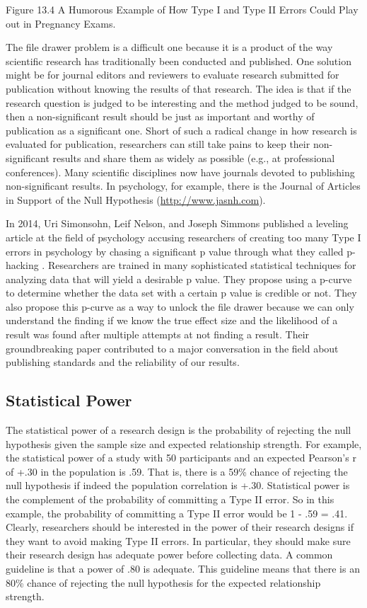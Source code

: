 Figure 13.4 A Humorous Example of How Type I and Type II Errors Could Play out in Pregnancy Exams.


The file drawer problem is a difficult one because it is a product of the way scientific research has traditionally been conducted and published. One solution might be for journal editors and reviewers to evaluate research submitted for publication without knowing the results of that research. The idea is that if the research question is judged to be interesting and the method judged to be sound, then a non-significant result should be just as important and worthy of publication as a significant one. Short of such a radical change in how research is evaluated for publication, researchers can still take pains to keep their non-significant results and share them as widely as possible (e.g., at professional conferences). Many scientific disciplines now have journals devoted to publishing non-significant results. In psychology, for example, there is the Journal of Articles in Support of the Null Hypothesis (\url{http://www.jasnh.com}).


In 2014, Uri Simonsohn, Leif Nelson, and Joseph Simmons published a leveling article at the field of psychology accusing researchers of creating too many Type I errors in psychology by chasing a significant p value through what they called p-hacking \citep{simonsohn_p-curve:_2014}. Researchers are trained in many sophisticated statistical techniques for analyzing data that will yield a desirable p value. They propose using a p-curve to determine whether the data set with a certain p value is credible or not. They also propose this p-curve as a way to unlock the file drawer because we can only understand the finding if we know the true effect size and the likelihood of a result was found after multiple attempts at not finding a result. Their groundbreaking paper contributed to a major conversation in the field about publishing standards and the reliability of our results.


\subsection{Statistical Power}

The statistical power of a research design is the probability of rejecting the null hypothesis given the sample size and expected relationship strength. For example, the statistical power of a study with 50 participants and an expected Pearson's r of +.30 in the population is .59. That is, there is a 59\% chance of rejecting the null hypothesis if indeed the population correlation is +.30. Statistical power is the complement of the probability of committing a Type II error. So in this example, the probability of committing a Type II error would be 1 - .59 = .41. Clearly, researchers should be interested in the power of their research designs if they want to avoid making Type II errors. In particular, they should make sure their research design has adequate power before collecting data. A common guideline is that a power of .80 is adequate. This guideline means that there is an 80\% chance of rejecting the null hypothesis for the expected relationship strength.


